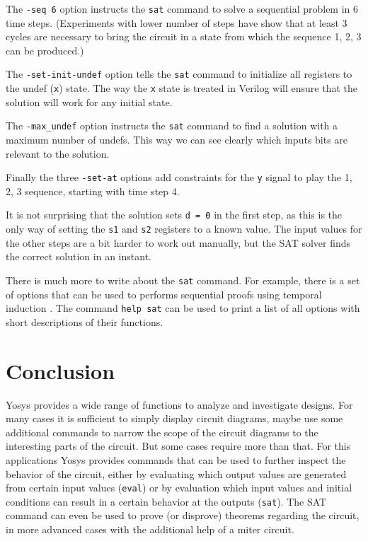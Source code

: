 \documentclass[9pt,technote,a4paper]{IEEEtran}
\begin{document}
The {\tt -seq 6} option instructs the {\tt sat} command to solve a sequential
problem in 6 time steps. (Experiments with lower number of steps have show that
at least 3 cycles are necessary to bring the circuit in a state from which
the sequence 1, 2, 3 can be produced.)

The {\tt -set-init-undef} option tells the {\tt sat} command to initialize
all registers to the undef ({\tt x}) state. The way the {\tt x} state
is treated in Verilog will ensure that the solution will work for any
initial state.

The {\tt -max\_undef} option instructs the {\tt sat} command to find a solution
with a maximum number of undefs. This way we can see clearly which inputs bits
are relevant to the solution.

Finally the three {\tt -set-at} options add constraints for the {\tt y}
signal to play the 1, 2, 3 sequence, starting with time step 4.

It is not surprising that the solution sets {\tt d = 0} in the first step, as
this is the only way of setting the {\tt s1} and {\tt s2} registers to a known
value. The input values for the other steps are a bit harder to work out
manually, but the SAT solver finds the correct solution in an instant.

\medskip

There is much more to write about the {\tt sat} command. For example, there is
a set of options that can be used to performs sequential proofs using temporal
induction \cite{tip}. The command {\tt help sat} can be used to print a list
of all options with short descriptions of their functions.

\section{Conclusion}
\label{conclusion}

Yosys provides a wide range of functions to analyze and investigate designs. For
many cases it is sufficient to simply display circuit diagrams, maybe use some
additional commands to narrow the scope of the circuit diagrams to the interesting
parts of the circuit. But some cases require more than that. For this applications
Yosys provides commands that can be used to further inspect the behavior of the
circuit, either by evaluating which output values are generated from certain input values
({\tt eval}) or by evaluation which input values and initial conditions can result
in a certain behavior at the outputs ({\tt sat}). The SAT command can even be used
to prove (or disprove) theorems regarding the circuit, in more advanced cases
with the additional help of a miter circuit.
\end{document}
